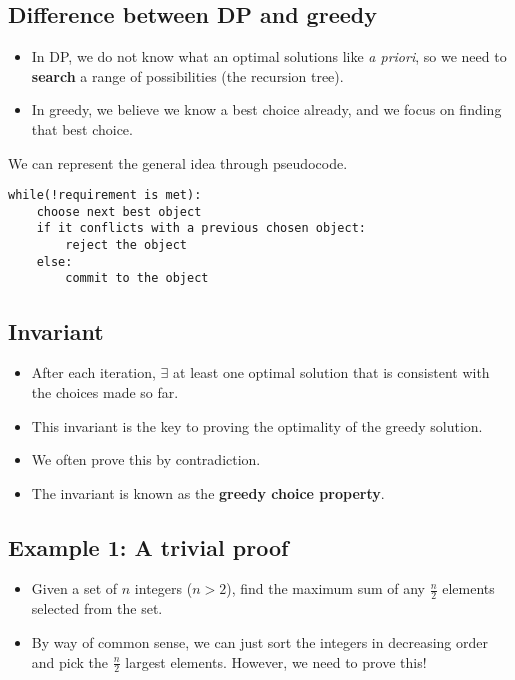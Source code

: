 \documentclass[12pt]{book}
\begin{document}
\subsection*{Difference between DP and greedy}

\begin{itemize}
    \item In DP, we do not know what an optimal solutions like \textit{a priori}, so we need to \textbf{search} a range of possibilities (the recursion tree).
    \item In greedy, we believe we know a best choice already, and we focus on finding that best choice.
\end{itemize}

We can represent the general idea through pseudocode.

\begin{lstlisting}
while(!requirement is met):
    choose next best object
    if it conflicts with a previous chosen object:
        reject the object
    else:
        commit to the object
\end{lstlisting}
\newpage
\subsection*{Invariant}
\begin{itemize}
    \item After each iteration, $\exists$ at least one optimal solution that is consistent with the choices made so far.
    \item This invariant is the key to proving the optimality of the greedy solution.
    \item We often prove this by contradiction.
    \item The invariant is known as the \textbf{greedy choice property}.
\end{itemize}

\subsection*{Example 1: A trivial proof}

\begin{itemize}
    \item Given a set of $n$ integers ($n>2$), find the maximum sum of any $\frac{n}{2}$ elements selected from the set.
    \item By way of common sense, we can just sort the integers in decreasing order and pick the $\frac{n}{2}$ largest elements. However, we need to prove this!
\end{itemize}
\end{document}

